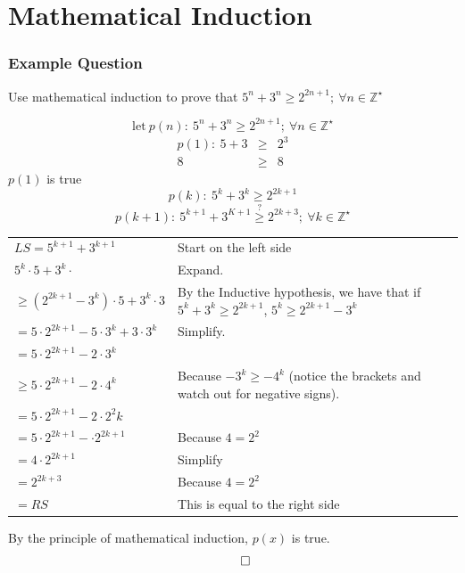 \documentclass{beamer}
\begin{document}
    \section{Mathematical Induction}
    \begin{frame}
        \frametitle{Example Question}
        Use mathematical induction to prove that $5^n + 3^n \geq 2^{2n+1};~\forall n \in \mathbb{Z}^\star$ 
    \end{frame}
    \begin{frame}[allowframebreaks]
        \step
        $$
            \text{let}~p(n):~5^n+3^n \geq 2^{2n+1};~\forall n \in \mathbb{Z}^\star
        $$
        \step
        \begin{eqnarray*}
            p(1):~5 + 3& \geq &2^3 \\
            8 & \geq & 8
        \end{eqnarray*}
        $p(1)$ is true
        \step
        $$
            p(k):~5^k + 3^k \geq 2^{2k+1}
        $$
        \step
        $$
            p(k+1):~5^{k+1} + 3^{K+1} \stackrel{?}{\geq} 2^{2k+3};~\forall k \in \mathbb{Z}^\star 
        $$
        \begin{table}
            \renewcommand{\arraystretch}{1.5}
            \begin{longtable}{lm{4cm}}
                $LS = 5^{k+1} + 3^{k+1} $ & Start on the left side \\
                $5^k\cdot 5 + 3^k \cdot$ & Expand. \\
                $\geq (2^{2k+1} - 3^k)\cdot 5 + 3^k \cdot 3$ & By the Inductive hypothesis, we have that if $5^k + 3^k \geq 2^{2k+1}$, $5^k \geq 2^{2k+1} - 3^k$ \\
                $=5\cdot 2^{2k+1} - 5 \cdot 3^k + 3 \cdot 3^k$ & Simplify. \\
                $= 5 \cdot 2^{2k+1} - 2\cdot3^k $ & \\
                $\geq 5\cdot 2^{2k+1} - 2 \cdot 4^k$ & Because $-3^k \geq -4^k$ (notice the brackets and watch out for negative signs). \\
                $=5\cdot 2^{2k+1} -2 \cdot 2^2k$ & \\
                $=5\cdot 2^{2k+1} - \cdot 2^{2k + 1}$ & Because $4 = 2^2$ \\
                $= 4\cdot 2^{2k+1}$ & Simplify \\
                $= 2^{2k+3}$ & Because $4 = 2^2$ \\
                $= RS$ & This is equal to the right side \\
            \end{longtable}
        \end{table}
        \step
        By the principle of mathematical induction, $p(x)$ is true.
        $$\qed$$
    \end{frame}
\end{document}
